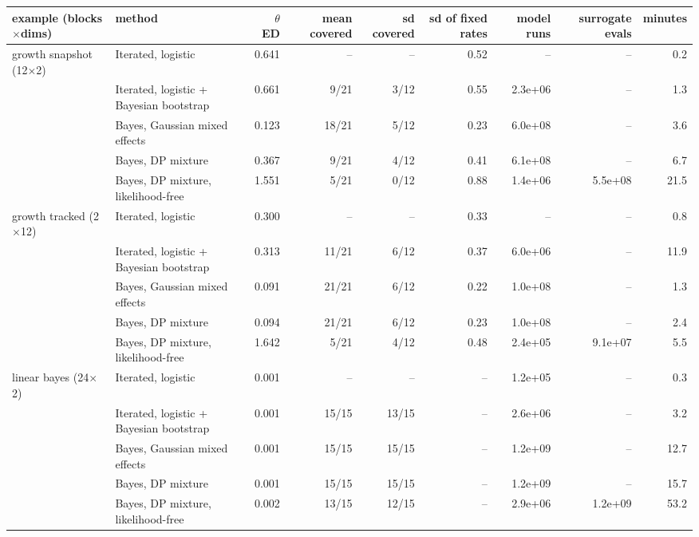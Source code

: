 \begin{tabular}{llrrrrrrr}
\toprule
example (blocks$\times$dims) & method & $\theta$ ED & mean covered & sd covered & sd of fixed rates & model runs & surrogate evals & minutes \\
\midrule
growth snapshot (12$\times$2) & Iterated, logistic & 0.641 & -- & -- & 0.52 & -- & -- & 0.2 \\
 & Iterated, logistic + Bayesian bootstrap & 0.661 & 9/21 & 3/12 & 0.55 & 2.3e+06 & -- & 1.3 \\
 & Bayes, Gaussian mixed effects & 0.123 & 18/21 & 5/12 & 0.23 & 6.0e+08 & -- & 3.6 \\
 & Bayes, DP mixture & 0.367 & 9/21 & 4/12 & 0.41 & 6.1e+08 & -- & 6.7 \\
 & Bayes, DP mixture, likelihood-free & 1.551 & 5/21 & 0/12 & 0.88 & 1.4e+06 & 5.5e+08 & 21.5 \\ \addlinespace
growth tracked (2$\times$12) & Iterated, logistic & 0.300 & -- & -- & 0.33 & -- & -- & 0.8 \\
 & Iterated, logistic + Bayesian bootstrap & 0.313 & 11/21 & 6/12 & 0.37 & 6.0e+06 & -- & 11.9 \\
 & Bayes, Gaussian mixed effects & 0.091 & 21/21 & 6/12 & 0.22 & 1.0e+08 & -- & 1.3 \\
 & Bayes, DP mixture & 0.094 & 21/21 & 6/12 & 0.23 & 1.0e+08 & -- & 2.4 \\
 & Bayes, DP mixture, likelihood-free & 1.642 & 5/21 & 4/12 & 0.48 & 2.4e+05 & 9.1e+07 & 5.5 \\ \addlinespace
linear bayes (24$\times$2) & Iterated, logistic & 0.001 & -- & -- & -- & 1.2e+05 & -- & 0.3 \\
 & Iterated, logistic + Bayesian bootstrap & 0.001 & 15/15 & 13/15 & -- & 2.6e+06 & -- & 3.2 \\
 & Bayes, Gaussian mixed effects & 0.001 & 15/15 & 15/15 & -- & 1.2e+09 & -- & 12.7 \\
 & Bayes, DP mixture & 0.001 & 15/15 & 15/15 & -- & 1.2e+09 & -- & 15.7 \\
 & Bayes, DP mixture, likelihood-free & 0.002 & 13/15 & 12/15 & -- & 2.9e+06 & 1.2e+09 & 53.2 \\
\bottomrule
\end{tabular}

